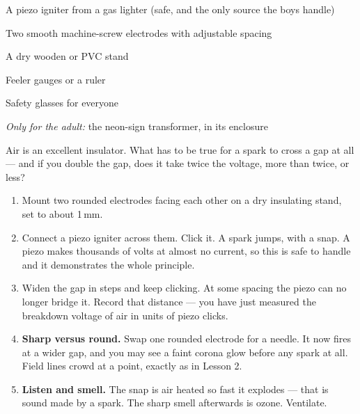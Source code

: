 



\highvoltagenote

\begin{materials}
\item A piezo igniter from a gas lighter (safe, and the only source the boys handle)
\item Two smooth machine-screw electrodes with adjustable spacing
\item A dry wooden or PVC stand
\item Feeler gauges or a ruler
\item Safety glasses for everyone
\item \emph{Only for the adult:} the neon-sign transformer, in its enclosure
\end{materials}

\begin{predict}
Air is an excellent insulator. What has to be true for a spark to cross a gap at
all --- and if you double the gap, does it take twice the voltage, more than
twice, or less?
\end{predict}

\begin{enumerate}
\item Mount two rounded electrodes facing each other on a dry insulating stand,
  set to about 1\,mm.
\item Connect a piezo igniter across them. Click it. A spark jumps, with a snap.
  A piezo makes thousands of volts at almost no current, so this is safe to
  handle and it demonstrates the whole principle.
\item Widen the gap in steps and keep clicking. At some spacing the piezo can no
  longer bridge it. Record that distance --- you have just measured the
  breakdown voltage of air in units of piezo clicks.
\item \textbf{Sharp versus round.} Swap one rounded electrode for a needle. It
  now fires at a wider gap, and you may see a faint corona glow before any spark
  at all. Field lines crowd at a point, exactly as in Lesson 2.
\item \textbf{Listen and smell.} The snap is air heated so fast it explodes ---
  that is sound made by a spark. The sharp smell afterwards is ozone. Ventilate.
\end{enumerate}

